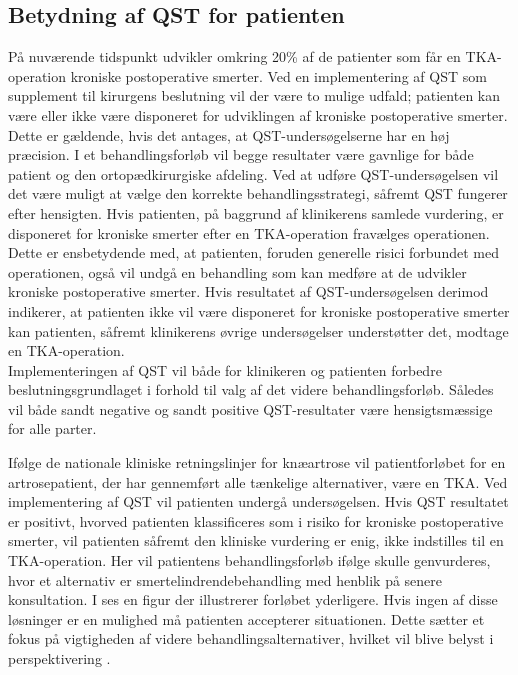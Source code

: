 \subsection{Betydning af QST for patienten}
På nuværende tidspunkt udvikler omkring 20\% af de patienter som får en TKA-operation kroniske postoperative smerter. Ved en implementering af QST som supplement til kirurgens beslutning vil der være to mulige udfald; patienten kan være eller ikke være disponeret for udviklingen af kroniske postoperative smerter. Dette er gældende, hvis det antages, at QST-undersøgelserne har en høj præcision. I et behandlingsforløb vil begge resultater være gavnlige for både patient og den ortopædkirurgiske afdeling. Ved at udføre QST-undersøgelsen vil det være muligt at vælge den korrekte behandlingsstrategi, såfremt QST fungerer efter hensigten. Hvis patienten, på baggrund af klinikerens samlede vurdering, er disponeret for kroniske smerter efter en TKA-operation fravælges operationen. Dette er ensbetydende med, at patienten, foruden generelle risici forbundet med operationen, også vil undgå en behandling som kan medføre at de udvikler kroniske postoperative smerter. Hvis resultatet af QST-undersøgelsen derimod indikerer, at patienten ikke vil være disponeret for kroniske postoperative smerter kan patienten, såfremt klinikerens øvrige undersøgelser understøtter det, modtage en TKA-operation. \\
Implementeringen af QST vil både for klinikeren og patienten forbedre beslutningsgrundlaget i forhold til valg af det videre behandlingsforløb. Således vil både sandt negative og sandt positive QST-resultater være hensigtsmæssige for alle parter.


Ifølge de nationale kliniske retningslinjer for knæartrose vil patientforløbet for en artrosepatient, der har gennemført alle tænkelige alternativer, være en TKA. \citep{brostrom2012} Ved implementering af QST vil patienten undergå undersøgelsen. Hvis QST resultatet er positivt, hvorved patienten klassificeres som i risiko for kroniske postoperative smerter, vil patienten såfremt den kliniske vurdering er enig, ikke indstilles til en TKA-operation. Her vil patientens behandlingsforløb ifølge  skulle genvurderes, hvor et alternativ er smertelindrendebehandling med henblik på senere konsultation. I  ses en figur der illustrerer forløbet yderligere. Hvis ingen af disse løsninger er en mulighed må patienten accepterer situationen. Dette sætter et fokus på vigtigheden af videre behandlingsalternativer, hvilket vil blive belyst i perspektivering . 
